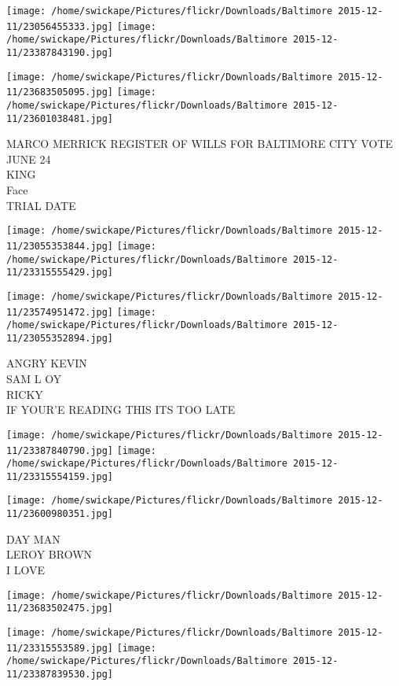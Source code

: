 \documentclass[10pt,letterpaper]{article}
\begin{document}
\texttt{[image: /home/swickape/Pictures/flickr/Downloads/Baltimore 2015-12-11/23056455333.jpg]}
\texttt{[image: /home/swickape/Pictures/flickr/Downloads/Baltimore 2015-12-11/23387843190.jpg]}

\texttt{[image: /home/swickape/Pictures/flickr/Downloads/Baltimore 2015-12-11/23683505095.jpg]}
\texttt{[image: /home/swickape/Pictures/flickr/Downloads/Baltimore 2015-12-11/23601038481.jpg]}

MARCO MERRICK REGISTER OF WILLS FOR BALTIMORE CITY VOTE JUNE 24\\
KING\\
Face\\
TRIAL DATE
\pagebreak

\texttt{[image: /home/swickape/Pictures/flickr/Downloads/Baltimore 2015-12-11/23055353844.jpg]}
\texttt{[image: /home/swickape/Pictures/flickr/Downloads/Baltimore 2015-12-11/23315555429.jpg]}

\texttt{[image: /home/swickape/Pictures/flickr/Downloads/Baltimore 2015-12-11/23574951472.jpg]}
\texttt{[image: /home/swickape/Pictures/flickr/Downloads/Baltimore 2015-12-11/23055352894.jpg]}

ANGRY KEVIN\\
SAM L OY\\
RICKY\\
IF YOUR'E READING THIS ITS TOO LATE
\pagebreak

\texttt{[image: /home/swickape/Pictures/flickr/Downloads/Baltimore 2015-12-11/23387840790.jpg]}
\texttt{[image: /home/swickape/Pictures/flickr/Downloads/Baltimore 2015-12-11/23315554159.jpg]}

\vspace{0.25in}
\texttt{[image: /home/swickape/Pictures/flickr/Downloads/Baltimore 2015-12-11/23600980351.jpg]}

DAY MAN\\
LEROY BROWN\\
I LOVE
\pagebreak

\texttt{[image: /home/swickape/Pictures/flickr/Downloads/Baltimore 2015-12-11/23683502475.jpg]}

\vspace{0.25in}
\texttt{[image: /home/swickape/Pictures/flickr/Downloads/Baltimore 2015-12-11/23315553589.jpg]}
\texttt{[image: /home/swickape/Pictures/flickr/Downloads/Baltimore 2015-12-11/23387839530.jpg]}
\end{document}
